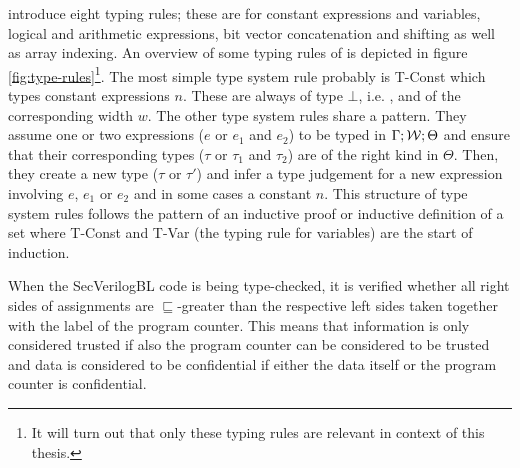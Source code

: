 \citeauthor{Ferraiuolo17} introduce eight typing rules; these are for constant expressions and variables, logical and arithmetic expressions, bit vector concatenation and shifting as well as array indexing.
An overview of some typing rules of \cite{Ferraiuolo17} is depicted in figure \ref{fig:type-rules}\footnote{%
    It will turn out that only these typing rules are relevant in context of this thesis.
}.
The most simple type system rule probably is T-Const which types constant expressions $ n $.
These are always of type $ \bot $, i.e. \PT, and of the corresponding width $ w $.
The other type system rules share a pattern.
They assume one or two expressions ($ e $ or $ e_1 $ and $ e_2 $) to be typed in $ \Gamma; \mathcal{W}; \Theta $ and ensure that their corresponding types ($ \tau $ or $ \tau_1 $ and $ \tau_2 $) are of the right kind in $ \Theta $.
Then, they create a new type ($ \tau $ or $ \tau' $) and infer a type judgement for a new expression involving $ e $, $ e_1 $ or $ e_2 $ and in some cases a constant $ n $.
This structure of type system rules follows the pattern of an inductive proof or inductive definition of a set where T-Const and T-Var (the typing rule for variables) are the start of induction.

When the SecVerilogBL code is being type-checked, it is verified whether all right sides of assignments are $ \sqsubseteq $-greater than the respective left sides taken together with the label of the program counter.
This means that information is only considered trusted if also the program counter can be considered to be trusted and data is considered to be confidential if either the data itself or the program counter is confidential.

